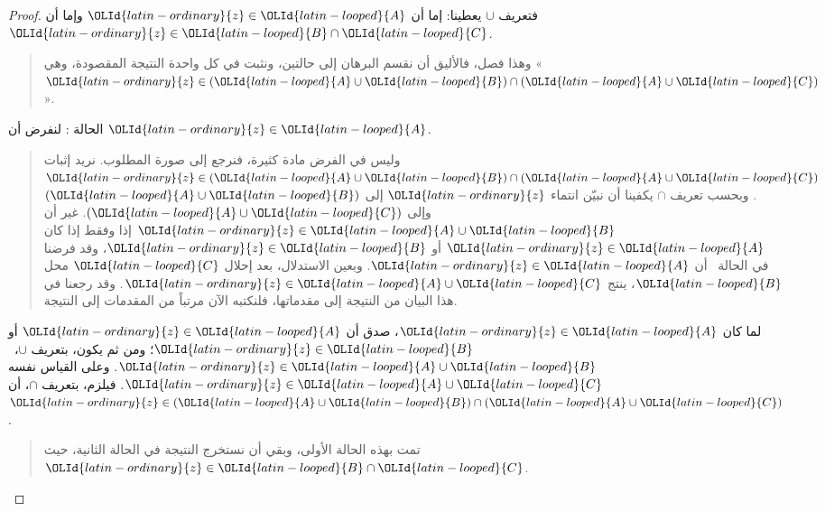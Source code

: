 \documentclass[../../../include/open-logic-section]{subfiles}
\begin{document}
\begin{proof}
فتعريف $\cup$ يعطينا: إما أن ${\OLId{latin-ordinary}{z}} \in {\OLId{latin-looped}{A}}$ وإما أن ${\OLId{latin-ordinary}{z}} \in {\OLId{latin-looped}{B}} \cap {\OLId{latin-looped}{C}}$.
\begin{quote}
وهذا فصل، فالأليق أن نقسم البرهان إلى حالتين، ونثبت في كل واحدة
النتيجة المقصودة، وهي «${\OLId{latin-ordinary}{z}} \in ({\OLId{latin-looped}{A}} \cup {\OLId{latin-looped}{B}}) \cap ({\OLId{latin-looped}{A}} \cup {\OLId{latin-looped}{C}})$».
\end{quote}
الحالة : لنفرض أن ${\OLId{latin-ordinary}{z}} \in {\OLId{latin-looped}{A}}$.
\begin{quote}
وليس في الفرض مادة كثيرة، فنرجع إلى صورة المطلوب. نريد إثبات
${\OLId{latin-ordinary}{z}} \in ({\OLId{latin-looped}{A}} \cup {\OLId{latin-looped}{B}}) \cap ({\OLId{latin-looped}{A}} \cup {\OLId{latin-looped}{C}})$. وبحسب تعريف $\cap$ يكفينا أن
نبيّن انتماء ${\OLId{latin-ordinary}{z}}$ إلى $({\OLId{latin-looped}{A}} \cup {\OLId{latin-looped}{B}})$ وإلى $({\OLId{latin-looped}{A}} \cup {\OLId{latin-looped}{C}})$. غير أن
${\OLId{latin-ordinary}{z}} \in {\OLId{latin-looped}{A}} \cup {\OLId{latin-looped}{B}}$ إذا وفقط إذا كان ${\OLId{latin-ordinary}{z}} \in {\OLId{latin-looped}{A}}$ أو ${\OLId{latin-ordinary}{z}} \in {\OLId{latin-looped}{B}}$، وقد فرضنا
في الحالة~ أن ${\OLId{latin-ordinary}{z}} \in {\OLId{latin-looped}{A}}$. وبعين الاستدلال، بعد إحلال ${\OLId{latin-looped}{C}}$ محل ${\OLId{latin-looped}{B}}$،
ينتج ${\OLId{latin-ordinary}{z}} \in {\OLId{latin-looped}{A}} \cup {\OLId{latin-looped}{C}}$. وقد رجعنا في هذا البيان من النتيجة إلى
مقدماتها، فلنكتبه الآن مرتباً من المقدمات إلى النتيجة.
\end{quote}
لما كان ${\OLId{latin-ordinary}{z}} \in {\OLId{latin-looped}{A}}$، صدق أن ${\OLId{latin-ordinary}{z}} \in {\OLId{latin-looped}{A}}$ أو ${\OLId{latin-ordinary}{z}} \in {\OLId{latin-looped}{B}}$؛ ومن ثم يكون،
بتعريف $\cup$،~${\OLId{latin-ordinary}{z}} \in {\OLId{latin-looped}{A}} \cup {\OLId{latin-looped}{B}}$. وعلى القياس نفسه
${\OLId{latin-ordinary}{z}} \in {\OLId{latin-looped}{A}} \cup {\OLId{latin-looped}{C}}$. فيلزم، بتعريف $\cap$، أن
${\OLId{latin-ordinary}{z}} \in ({\OLId{latin-looped}{A}} \cup {\OLId{latin-looped}{B}}) \cap ({\OLId{latin-looped}{A}} \cup {\OLId{latin-looped}{C}})$.
\begin{quote}
تمت بهذه الحالة الأولى، وبقي أن نستخرج النتيجة في الحالة الثانية،
حيث ${\OLId{latin-ordinary}{z}} \in {\OLId{latin-looped}{B}} \cap {\OLId{latin-looped}{C}}$.
\end{quote}

\end{proof}
\end{document}
